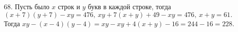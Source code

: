 68. Пусть было $x$ строк и $y$ букв в каждой строке, тогда $(x+7)(y+7)-xy=476,\ xy+7(x+y)+49-xy=476,\ x+y=61.$ Тогда $xy-(x-4)(y-4)=xy-xy+4(x+y)-16=244-16=228.$\\
